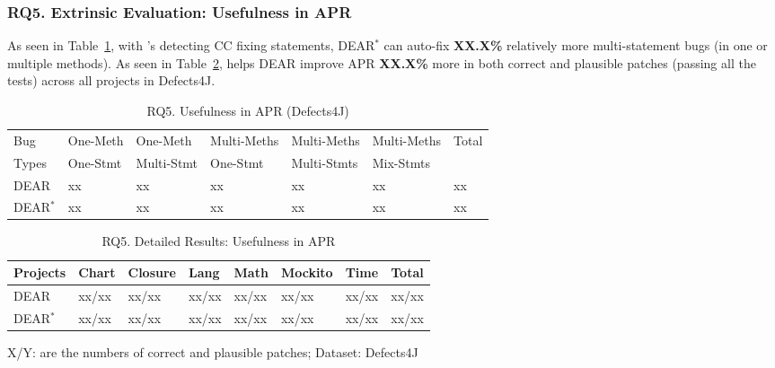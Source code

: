\subsubsection{\bf RQ5. Extrinsic Evaluation: Usefulness in APR}
As seen in Table~\ref{RQ5_1}, with {\tool}'s detecting CC fixing
statements, DEAR$^{*}$ can auto-fix {\bf XX.X\%} relatively more
multi-statement bugs (in one or multiple methods). As seen in
Table~\ref{RQ5_2}, {\tool} helps DEAR improve APR {\bf XX.X\%} more in
both correct and plausible patches (passing all the tests) across all
projects in Defects4J.

\begin{table}[t]
	\caption{RQ5. Usefulness in APR (Defects4J)}
	\vspace{-12pt}
	\begin{center}
        \tabcolsep 2pt
		\footnotesize
		\renewcommand{\arraystretch}{1} 
		\begin{tabular}{p{0.7cm}<{\centering}|p{1.1cm}<{\centering}|p{1.1cm}<{\centering}|p{1.3cm}<{\centering}|p{1.3cm}<{\centering}|p{1.3cm}<{\centering}|p{0.7cm}<{\centering}}
			\hline
			Bug & One-Meth & One-Meth & Multi-Meths & Multi-Meths & Multi-Meths & Total\\
			Types          & One-Stmt & Multi-Stmt & One-Stmt & Multi-Stmts & Mix-Stmts & \\\hline
			DEAR & xx & xx & xx & xx & xx & xx\\
			DEAR$^{*}$ & xx & xx & xx & xx & xx & xx\\ 
			\hline
		\end{tabular}
		\label{RQ5_1}
	\end{center}
\vspace{-5pt}
\end{table}

\begin{table}[t]
	\caption{RQ5. Detailed Results: Usefulness in APR}
	\vspace{-10pt}
	\begin{center}
        \footnotesize
		\renewcommand{\arraystretch}{1} 
		\begin{tabular}{l|p{0.6cm}<{\centering}p{0.6cm}<{\centering}p{0.6cm}<{\centering}p{0.6cm}<{\centering}p{0.8cm}<{\centering}p{0.6cm}<{\centering}|p{0.5cm}<{\centering}}
			\hline
			Projects  & Chart & Closure & Lang & Math & Mockito & Time & Total\\
			\hline
			DEAR  & xx/xx  &  xx/xx     & xx/xx & xx/xx & xx/xx     & xx/xx  & xx/xx\\
		        DEAR$^{*}$ & xx/xx  &  xx/xx     & xx/xx & xx/xx & xx/xx     & xx/xx  & xx/xx\\
			\hline
		\end{tabular}
		
		{\footnotesize X/Y: are the numbers of correct and plausible patches; Dataset: Defects4J}
		\label{RQ5_2}
	\end{center}
\vspace{-5pt}
\end{table}


